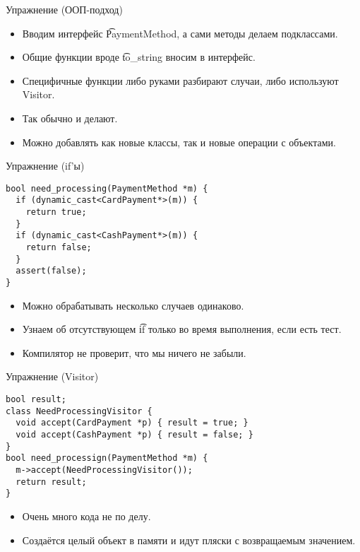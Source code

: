 \begin{frame}{Упражнение (ООП-подход)}
	\begin{itemize}
		\item Вводим интерфейс \t{PaymentMethod}, а сами методы делаем подклассами.
		\item Общие функции вроде \t{to\_string} вносим в интерфейс.
		\item Специфичные функции либо руками разбирают случаи, либо используют Visitor.
		\item Так обычно и делают.
		\item Можно добавлять как новые классы, так и новые операции с объектами.
	\end{itemize}
\end{frame}

\begin{frame}[fragile]{Упражнение (if'ы)}
\begin{verbatim}
bool need_processing(PaymentMethod *m) {
  if (dynamic_cast<CardPayment*>(m)) {
    return true;
  }
  if (dynamic_cast<CashPayment*>(m)) {
    return false;
  }
  assert(false);
}
\end{verbatim}
	\begin{itemize}
		\item Можно обрабатывать несколько случаев одинаково.
		\item Узнаем об отсутствующем \t{if} только во время выполнения, если есть тест.
		\item Компилятор не проверит, что мы ничего не забыли.
	\end{itemize}
\end{frame}

\begin{frame}[fragile]{Упражнение (Visitor)}
\begin{verbatim}
bool result;
class NeedProcessingVisitor {
  void accept(CardPayment *p) { result = true; }
  void accept(CashPayment *p) { result = false; }
}
bool need_processign(PaymentMethod *m) {
  m->accept(NeedProcessingVisitor());
  return result;
}
\end{verbatim}
	\begin{itemize}
		\item Очень много кода не по делу.
		\item Создаётся целый объект в памяти и идут пляски с возвращаемым значением.
	\end{itemize}
\end{frame}

